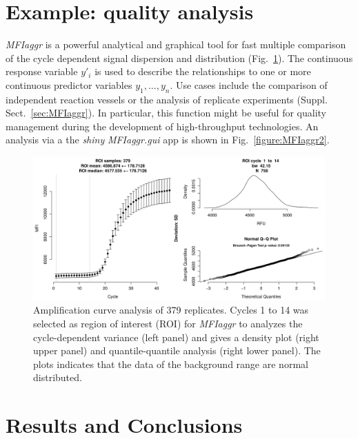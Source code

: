 \documentclass{bioinfo}
\begin{document}
\section{Example: quality analysis}

\textsl{MFIaggr} is a powerful analytical and graphical tool for fast multiple 
comparison of the cycle dependent signal dispersion and distribution 
(Fig.~\ref{fig:01}). The continuous response variable $y'_i$ is used to 
describe the relationships to one or more continuous predictor variables $y_1, 
..., y_n$. Use cases include the comparison of independent reaction vessels or 
the analysis of replicate experiments (Suppl. Sect.~\ref{sec:MFIaggr}). In 
particular, this function might be useful for quality management during the 
development of high-throughput technologies. An analysis via a the \emph{shiny} 
\textsl{MFIaggr.gui} app is shown in Fig.~\ref{figure:MFIaggr2}.

\begin{figure}[!tpb]%
\centerline{\includegraphics{fig01.jpg}}
\caption{Amplification curve analysis of 379 replicates. Cycles 1 to 14 was 
selected as region of interest (ROI) for \textsl{MFIaggr} to analyzes the 
cycle-dependent variance (left panel) and gives a density plot (right upper 
panel) and quantile-quantile analysis (right lower panel). The plots indicates 
that the data of the background range are normal distributed.}\label{fig:01}
\end{figure}

\section{Results and Conclusions}
\end{document}
